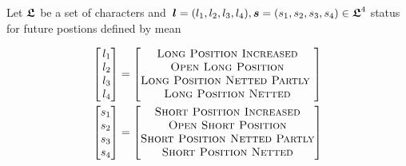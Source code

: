 \begin{definition}

Let $\boldsymbol{\mathfrak{L}}$ be a set of characters and\, $\boldsymbol l=(l_{1}, l_{2}, l_{3}, l_{4}),\boldsymbol s=(s_{1}, s_{2}, s_{3}, s_{4})\in\boldsymbol{\mathfrak{L}}^4$
status for future postions defined by mean

\begin{align}
\begin{bmatrix}
        \,l_{1} \\
        \,l_{2} \\
        \,l_{3} \\
        \,l_{4}
\end{bmatrix}
&=
\begin{bmatrix}
        \textsc{Long Position Increased} \\
        \textsc{Open Long Position} \\
        \textsc{Long Position Netted Partly\,\,} \\
        \textsc{Long Position Netted} \\ 
\end{bmatrix}
\\
\begin{bmatrix}
        s_{1} \\
        s_{2} \\
        s_{3} \\
        s_{4}
\end{bmatrix}
&=
\begin{bmatrix}
        \textsc{Short Position Increased} \\
        \textsc{Open Short Position} \\
        \textsc{Short Position Netted Partly} \\
        \textsc{Short Position Netted} \\ 
\end{bmatrix}
\end{align}

\end{definition}
